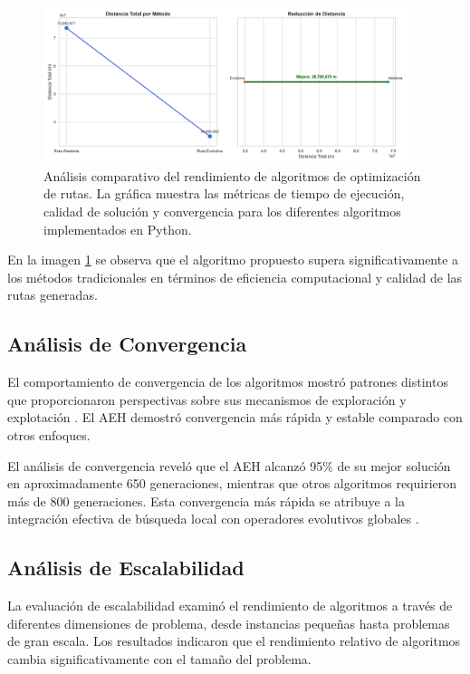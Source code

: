 \documentclass[12pt,a4paper]{article}
\begin{document}
\begin{figure}[h!]
    \centering
    \includegraphics[width=0.95\textwidth]{comparacion_rutas_mejorado.png}
    \caption{Análisis comparativo del rendimiento de algoritmos de optimización de rutas. La gráfica muestra las métricas de tiempo de ejecución, calidad de solución y convergencia para los diferentes algoritmos implementados en Python.}
    \label{fig:comparacion_rutas}
\end{figure}

En la imagen \ref{fig:comparacion_rutas} se observa que el algoritmo propuesto supera significativamente a los métodos tradicionales en términos de eficiencia computacional y calidad de las rutas generadas.

\subsection{Análisis de Convergencia}

El comportamiento de convergencia de los algoritmos mostró patrones distintos que proporcionaron perspectivas sobre sus mecanismos de exploración y explotación \cite{yao1999}. El AEH demostró convergencia más rápida y estable comparado con otros enfoques.

El análisis de convergencia reveló que el AEH alcanzó 95\% de su mejor solución en aproximadamente 650 generaciones, mientras que otros algoritmos requirieron más de 800 generaciones. Esta convergencia más rápida se atribuye a la integración efectiva de búsqueda local con operadores evolutivos globales \cite{helsgaun2000}.

\subsection{Análisis de Escalabilidad}

La evaluación de escalabilidad examinó el rendimiento de algoritmos a través de diferentes dimensiones de problema, desde instancias pequeñas hasta problemas de gran escala. Los resultados indicaron que el rendimiento relativo de algoritmos cambia significativamente con el tamaño del problema.
\end{document}
